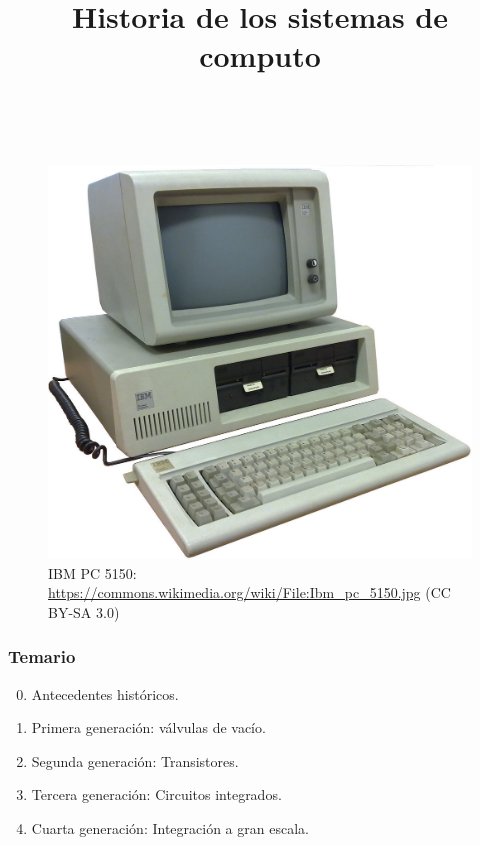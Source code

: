 \documentclass[11pt,a4paper,spanish]{beamer}
\title{Historia de los sistemas de computo}
\author{}
\date{}
\begin{document}
\begin{frame}[noframenumbering]

    \maketitle
    \centering
    \vspace{-8em}~
    \begin{figure}
    \includegraphics[height=0.65\textheight]{img/ibm-pc-5150.jpg}
        \captionsetup{textfont=tiny,labelformat=empty}
        \caption{IBM PC 5150: \url{https://commons.wikimedia.org/wiki/File:Ibm\_pc\_5150.jpg} (CC BY-SA 3.0)}
    \end{figure}

\end{frame}

\begin{frame}

    \frametitle{Temario}

\begin{enumerate}

    \setcounter{enumi}{-1}

    \item Antecedentes históricos.

    \item Primera generación: válvulas de vacío.

    \item Segunda generación: Transistores.

    \item Tercera generación: Circuitos integrados.

    \item Cuarta generación: Integración a gran escala.

\end{enumerate}

\end{frame}
\end{document}
